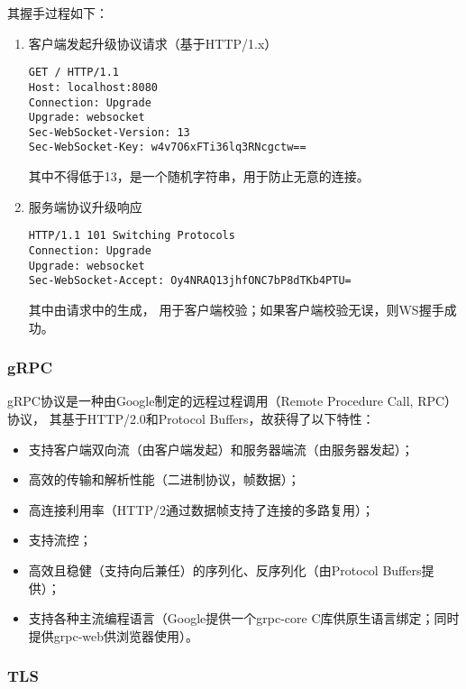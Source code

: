 其握手过程如下：

\begin{enumerate}
    \item 客户端发起升级协议请求（基于HTTP/1.x）\\
        \begin{lstlisting}
GET / HTTP/1.1 
Host: localhost:8080 
Connection: Upgrade 
Upgrade: websocket 
Sec-WebSocket-Version: 13 
Sec-WebSocket-Key: w4v7O6xFTi36lq3RNcgctw==
        \end{lstlisting}
        其中不得低于13，是一个随机字符串，用于防止无意的连接。
    \item 服务端协议升级响应 \\
        \begin{lstlisting}
HTTP/1.1 101 Switching Protocols
Connection: Upgrade
Upgrade: websocket
Sec-WebSocket-Accept: Oy4NRAQ13jhfONC7bP8dTKb4PTU=
        \end{lstlisting}
        其中由请求中的生成，
        用于客户端校验；如果客户端校验无误，则WS握手成功。
\end{enumerate}

\subsubsection{gRPC}

gRPC协议是一种由Google制定的远程过程调用（Remote Procedure Call, RPC）协议，
其基于HTTP/2.0和Protocol Buffers，故获得了以下特性：

\begin{itemize}
    \item 支持客户端双向流（由客户端发起）和服务器端流（由服务器发起）；
    \item 高效的传输和解析性能（二进制协议，帧数据）；
    \item 高连接利用率（HTTP/2通过数据帧支持了连接的多路复用）；
    \item 支持流控；
    \item 高效且稳健（支持向后兼任）的序列化、反序列化（由Protocol Buffers提供）；
    \item 支持各种主流编程语言（Google提供一个grpc-core C库供原生语言绑定；同时提供grpc-web供浏览器使用）。
\end{itemize}

\subsubsection{TLS}

